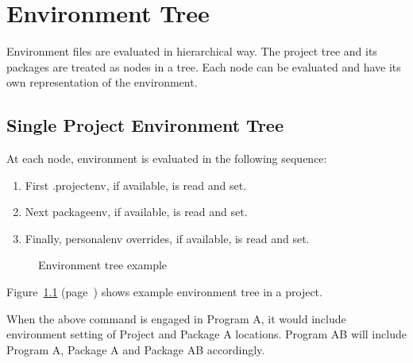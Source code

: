 \documentclass[design.tex]{subfiles}
\begin{document}
\chapter{Environment Tree} 
Environment files are evaluated in hierarchical way.  The project tree and its packages are treated as nodes in a tree.  Each node can be evaluated and have its own representation of the environment.
 
\section{Single Project Environment Tree}
At each node, environment is evaluated in the following sequence:
\begin{enumerate}
	\item First .projectenv, if available, is read and set.
	\item Next packageenv, if available, is read and set.
	\item Finally, personalenv overrides, if available, is read and set.
\end{enumerate} 

\begin{figure}[h]
	\centering
	\caption{Environment tree example}
	\label{fig:environment_tree}
\end{figure}

Figure~\ref{fig:environment_tree} (page~\pageref{fig:environment_tree}) shows example environment tree in a project.

When the above command is engaged in Program A, it would include environment setting of Project and Package A locations.  Program AB will include Program A, Package A and Package AB accordingly.
\end{document}
